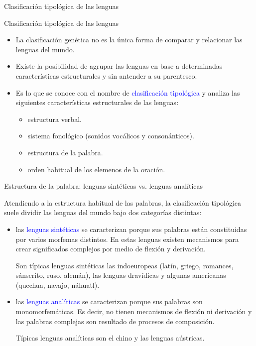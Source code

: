 \documentclass[handout]{beamer}
\begin{document}
\begin{frame}{}
\begin{center}
\LARGE Clasificación tipológica de las lenguas 
\end{center}
\end{frame}

\begin{frame}{Clasificación tipológica de las lenguas}
\begin{itemize}
	\item La clasificación genética no es la única forma de comparar y relacionar las lenguas del mundo.
	\item Existe la posibilidad de agrupar las lenguas en base a determinadas características estructurales y sin antender a su parentesco. 
	\item Es lo que se conoce con el nombre de \textcolor{blue}{clasificación tipológica} y analiza las siguientes características estructurales de las lenguas:
	\begin{itemize}
		\item estructura verbal.
		\item sistema fonológico (sonidos vocálicos y consonánticos).
		\item estructura de la palabra.
		\item orden habitual de los elemenos de la oración.
	\end{itemize}
\end{itemize}
\end{frame}

\begin{frame}{Estructura de la palabra: lenguas sintéticas vs. lenguas analíticas}

Atendiendo a la estructura habitual de las palabras, la clasificación tipológica suele dividir las lenguas del mundo bajo dos categorías distintas: 

\begin{itemize}
	\item las \textcolor{blue}{lenguas sintéticas} se caracterizan porque sus palabras están constituidas por varios morfemas distintos. En estas lenguas existen mecanismos para crear significados complejos por medio de flexión y derivación.
	
	Son típicas lenguas sintéticas las indoeuropeas (latín, griego, romances, sánscrito, ruso, alemán), las lenguas dravídicas y algunas americanas (quechua, navajo, náhuatl).
	
	\item las \textcolor{blue}{lenguas analíticas} se caracterizan porque sus palabras son monomorfemáticas. Es decir, no tienen mecanismos de flexión ni derivación y las palabras complejas son resultado de procesos de composición. 
	
	Típicas lenguas analíticas son el chino y las lenguas aústricas.   
	
\end{itemize}
\end{frame}
\end{document}
